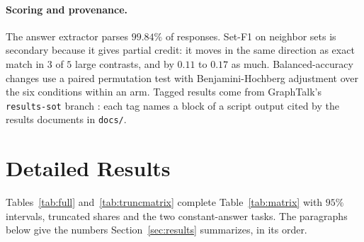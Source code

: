 \documentclass[11pt]{article}
\begin{document}
\paragraph{Scoring and provenance.} The answer extractor parses $99.84\%$ of responses. Set-F1 on neighbor sets is secondary because it gives partial credit: it moves in the same direction as exact match in $3$ of $5$ large contrasts, and by $0.11$ to $0.17$ as much. Balanced-accuracy changes use a paired permutation test with Benjamini-Hochberg adjustment over the six conditions within an arm. Tagged results come from GraphTalk's \texttt{results-sot} branch \citep{graphtalkresults2026}: each tag names a block of a script output cited by the results documents in \texttt{docs/}. %

\section{Detailed Results}
\label{app:detail}
\label{app:more}
\label{app:tables}
Tables~\ref{tab:full} and~\ref{tab:truncmatrix} complete Table~\ref{tab:matrix} with $95\%$ intervals, truncated shares and the two constant-answer tasks. The paragraphs below give the numbers Section~\ref{sec:results} summarizes, in its order.
\end{document}
